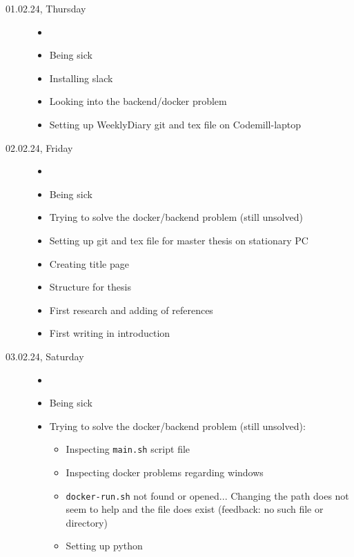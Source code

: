 \documentclass[a4, 11pt]{scrartcl}
\begin{document}
\begin{description}





\item[01.02.24, Thursday]
\begin{itemize}
	\item[]
	\item Being sick \frownie{}
	\item Installing slack
	\item Looking into the backend/docker problem %
	\item Setting up WeeklyDiary git and tex file on Codemill-laptop
\end{itemize}






\item[02.02.24, Friday]
\begin{itemize}
	\item[]
	\item Being sick \frownie{}
	\item Trying to solve the docker/backend problem (still unsolved)
	\item Setting up git and tex file for master thesis on stationary PC
	\item Creating title page
	\item Structure for thesis
	\item First research and adding of references
	\item First writing in introduction
\end{itemize}




\item[03.02.24, Saturday]
\begin{itemize}
	\item[]
	\item Being sick \frownie{}
	\item Trying to solve the docker/backend problem (still unsolved):
	\begin{itemize}
		\item Inspecting \texttt{main.sh} script file
		\item Inspecting docker problems regarding windows
		\item \texttt{docker-run.sh} not found or opened... Changing the path does not seem to help and the file does exist (feedback: no such file or directory)
		\item Setting up python
	\end{itemize}
\end{itemize}


\end{description}
\end{document}

